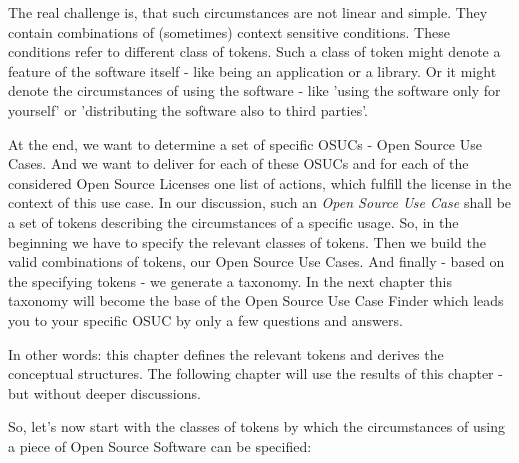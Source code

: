 The real challenge is, that such circumstances are not linear and simple. They
contain combinations of (sometimes) context sensitive conditions. These
conditions refer to different class of tokens. Such a class of token might
denote a feature of the software itself - like being an application or a
library. Or it might denote the circumstances of using the software - like
'using the software only for yourself' or 'distributing the software also to
third parties'.

At the end, we want to determine a set of specific OSUCs - Open Source Use
Cases. And we want to deliver for each of these OSUCs and for each of the
considered Open Source Licenses one list of actions, which fulfill the license
in the context of this use case. In our discussion, such an \textit{Open Source
Use Case} shall be a set of tokens describing the circumstances of a specific
usage. So, in the beginning we have to specify the relevant classes of tokens.
Then we build the valid combinations of tokens, our Open Source Use Cases. And
finally - based on the specifying tokens - we generate a taxonomy. In the
next chapter this taxonomy will become the base of the Open Source Use Case
Finder which leads you to your specific OSUC by only a few questions and
answers. 

In other words: this chapter defines the relevant tokens and derives the
conceptual structures. The following chapter will use the results of this
chapter - but without deeper discussions.

So, let's now start with the classes of tokens by which the circumstances of
using a piece of Open Source Software can be specified:

